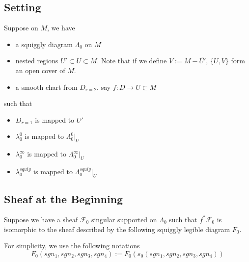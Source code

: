 \subsection*{Setting}
Suppose on $M$, we have
\begin{itemize}
\item  a squiggly diagram $\Lambda_0$ on $M$

\item nested regions $U' \subset U \subset M$. Note that if we define $V:= M - \overline{U'}$, $\{U,V\}$ form an open cover of $M$.

\item a smooth chart from $D_{r=2}$, say $f: D  \rightarrow U \subset M$
\end{itemize}
such that 
\begin{itemize}
\item $D_{r=1}$ is mapped to $U'$ 

\item $\lambda_0^0$ is mapped to $\Lambda_0^0 |_{U}$

\item $\lambda_0^\infty$ is mapped to $\Lambda_0^\infty |_{U}$

\item $\lambda_0^{squig}$ is mapped to $\Lambda_0^{squig} |_{U}$
\end{itemize}

\subsection*{Sheaf at the Beginning}
Suppose we have a sheaf $\mathscr{F}_0$ singular supported on $\Lambda_0$ such that $f^*\mathscr{F}_0$ is isomorphic to the sheaf described by the following squiggly legible diagram $F_0$.

For simplicity, we use the following notations
\[
F_0(sgn_1,sgn_2,sgn_3,sgn_4):= F_0(s_0(sgn_1,sgn_2,sgn_3,sgn_4))
\]

